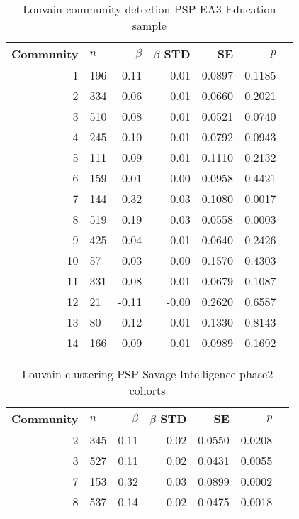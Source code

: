 \begin{table}[ht]
\centering
\setlength{\extrarowheight}{2pt}
\begin{tabular}{rlrrrrr}
  \toprule
 Community & $n$ & $\beta$ & $\beta$ STD & SE & $p$\\ 
  \midrule
 1  & 196 & 0.11 & 0.01 & 0.0897 & 0.1185 \\ 
  2  & 334 & 0.06 & 0.01 & 0.0660 & 0.2021 \\ 
  3  & 510 & 0.08 & 0.01 & 0.0521 & 0.0740 \\ 
 4  & 245 & 0.10 & 0.01 & 0.0792 & 0.0943 \\ 
  5  & 111 & 0.09 & 0.01 & 0.1110 & 0.2132 \\ 
 6  & 159 & 0.01 & 0.00 & 0.0958 & 0.4421 \\ 
7  & 144 & 0.32 & 0.03 & 0.1080 & 0.0017 \\ 
  8  & 519 & 0.19 & 0.03 & 0.0558 & 0.0003 \\ 
  9  & 425 & 0.04 & 0.01 & 0.0640 & 0.2426 \\ 
   10  & 57 & 0.03 & 0.00 & 0.1570 & 0.4303 \\ 
  11  & 331 & 0.08 & 0.01 & 0.0679 & 0.1087 \\ 
   12  & 21 & -0.11 & -0.00 & 0.2620 & 0.6587 \\ 
  13  & 80 & -0.12 & -0.01 & 0.1330 & 0.8143 \\ 
  14  & 166 & 0.09 & 0.01 & 0.0989 & 0.1692 \\ 
   \bottomrule
\end{tabular}
\caption{Louvain community detection PSP EA3 Education sample}
\label{tab:Louvain clustering EA3 Education cohorts}
\end{table}


\begin{table}[ht]
\centering
\setlength{\extrarowheight}{2pt}
\begin{tabular}{rlrrrrr}
  \toprule
 Community & $n$ & $\beta$ & $\beta$ STD & SE & $p$\\ 
  \midrule
 2  & 345 & 0.11 & 0.02 & 0.0550 & 0.0208 \\ 
   3  & 527 & 0.11 & 0.02 & 0.0431 & 0.0055 \\ 
  7  & 153 & 0.32 & 0.03 & 0.0899 & 0.0002 \\ 
  8  & 537 & 0.14 & 0.02 & 0.0475 & 0.0018 \\ 
   \bottomrule
\end{tabular}
\caption{Louvain clustering PSP Savage Intelligence phase2 cohorts}
\label{tab:Louvain clustering Savage intelligence phase 2 cohorts}
\end{table}






